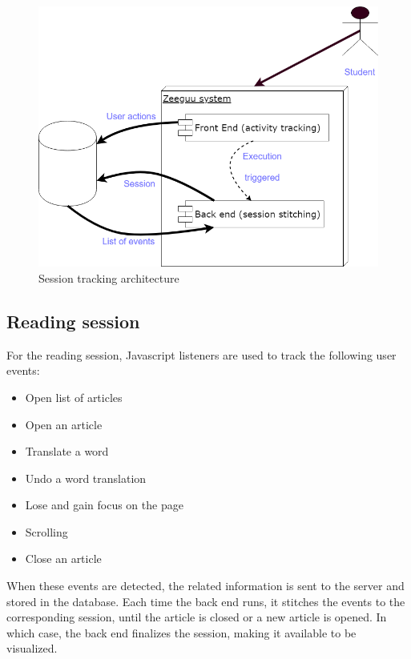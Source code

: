 \begin{figure}[bth]
	\centering
	\includegraphics[width=0.7\linewidth]{gfx/session_tracking_architecture}
	\caption{Session tracking architecture}\label{fig:session_tracking_architecture}
\end{figure}

\subsection{Reading session}\label{p02:session_tracking_read_session}
For the reading session, Javascript listeners are used to track the following user events:
\begin{itemize}
	\item Open list of articles
	\item Open an article
	\item Translate a word
	\item Undo a word translation
	\item Lose and gain focus on the page
	\item Scrolling
	\item Close an article
\end{itemize}

When these events are detected, the related information is sent to the server and stored in the database. Each time the back end runs, it stitches the events to the corresponding session, until the article is closed or a new article is opened. In which case, the back end finalizes the session, making it available to be visualized.

